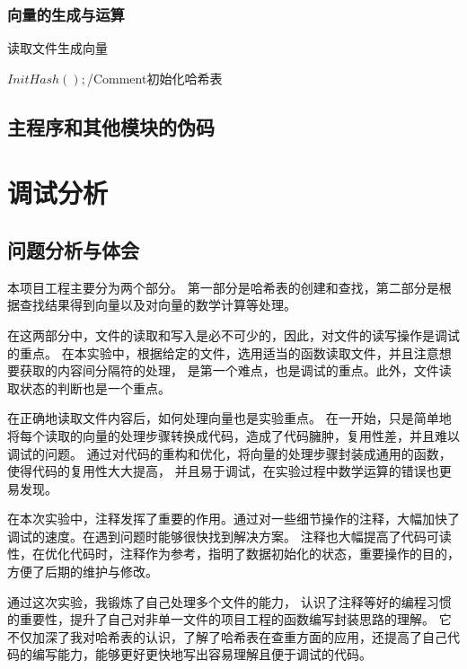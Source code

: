 \documentclass[a4paper]{article}
\begin{document}
	\subsubsection{向量的生成与运算}
	\begin{algorithm}
		\caption{读取文件生成向量}
		\begin{algorithmic}[1] %
				\State $InitHash();$/Comment{初始化哈希表}

			\EndFunction
		\end{algorithmic}\label{alg:algorithm3}
	\end{algorithm}

	\subsection{主程序和其他模块的伪码}\label{subsec:code2}


	\section{调试分析}\label{sec:debug}

	\subsection{问题分析与体会}\label{subsec:analysis}
	{{本项目工程主要分为两个部分。
	第一部分是哈希表的创建和查找，第二部分是根据查找结果得到向量以及对向量的数学计算等处理。}}

	{在这两部分中，文件的读取和写入是必不可少的，因此，对文件的读写操作是调试的重点。
	在本实验中，根据给定的文件，选用适当的函数读取文件，并且注意想要获取的内容间分隔符的处理，
	是第一个难点，也是调试的重点。此外，文件读取状态的判断也是一个重点。}

	{{在正确地读取文件内容后，如何处理向量也是实验重点。
	在一开始，只是简单地将每个读取的向量的处理步骤转换成代码，造成了代码臃肿，复用性差，并且难以调试的问题。
	通过对代码的重构和优化，将向量的处理步骤封装成通用的函数，使得代码的复用性大大提高，
	并且易于调试，在实验过程中数学运算的错误也更易发现。}}

	{{在本次实验中，注释发挥了重要的作用。通过对一些细节操作的注释，大幅加快了调试的速度。在遇到问题时能够很快找到解决方案。
	注释也大幅提高了代码可读性，在优化代码时，注释作为参考，指明了数据初始化的状态，重要操作的目的，方便了后期的维护与修改。}}

	{{通过这次实验，我锻炼了自己处理多个文件的能力，
	认识了注释等好的编程习惯的重要性，提升了自己对非单一文件的项目工程的函数编写封装思路的理解。
	它不仅加深了我对哈希表的认识，了解了哈希表在查重方面的应用，还提高了自己代码的编写能力，能够更好更快地写出容易理解且便于调试的代码。}}
\end{document}
